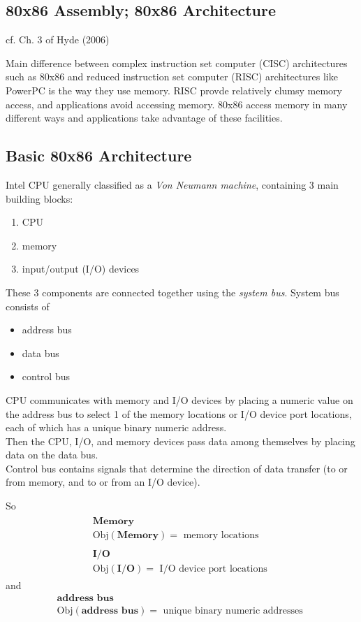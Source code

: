 \documentclass[10pt]{amsart}
\begin{document}
\begin{multicols*}{2}
\section{80x86 Assembly; 80x86 Architecture}  

cf. Ch. 3 of Hyde (2006) \cite{Hyde2006}

Main difference between complex instruction set computer (CISC) architectures such as 80x86 and reduced instruction set computer (RISC) architectures like PowerPC is the way they use memory.  RISC provde relatively clumsy memory access, and applications avoid accessing memory.  80x86 access memory in many different ways and applications take advantage of these facilities.  

\subsection{Basic 80x86 Architecture}  

Intel CPU generally classified as a \emph{Von Neumann machine}, containing 3 main building blocks:
\begin{enumerate}
	\item CPU
	\item memory
	\item input/output (I/O) devices
\end{enumerate}
These 3 components are connected together using the \emph{system bus}.  System bus consists of 
\begin{itemize}
	\item address bus
	\item data bus
	\item control bus
\end{itemize}

CPU communicates with memory and I/O devices by placing a numeric value on the address bus to select 1 of the memory locations or I/O device port locations, each of which has a unique binary numeric address.   \\
Then the CPU, I/O, and memory devices pass data among themselves by placing data on the data bus.   \\
Control bus contains signals that determine the direction of data transfer (to or from memory, and to or from an I/O device).  

So 
\[
\begin{gathered}
\begin{gathered}
\textbf{Memory} \\
\text{Obj}{(\textbf{Memory})} = \text{ memory locations } 
\end{gathered} \\ 
\begin{gathered}
\textbf{I/O} \\
\text{Obj}{(\textbf{I/O})} = \text{ I/O device port locations } 
\end{gathered}
\end{gathered}
\]
and 
\[
\begin{gathered}
\textbf{address bus} \\
\text{Obj}{(\textbf{address bus})} = \text{ unique binary numeric addresses } 
\end{gathered}
\]


\end{multicols*}
\end{document}
